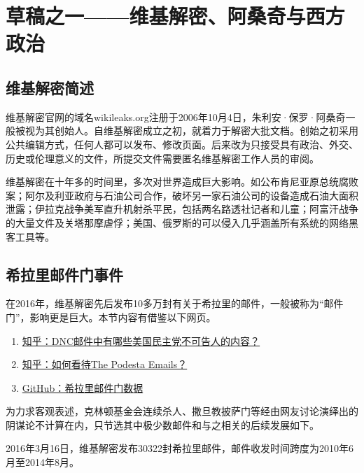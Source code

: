 
\chapter{草稿之一——维基解密、阿桑奇与西方政治}

\section{维基解密简述}

维基解密官网的域名wikileaks.org注册于2006年10月4日，朱利安·保罗·阿桑奇一般被视为其创始人。自维基解密成立之初，就着力于解密大批文档。创始之初采用公共编辑方式，任何人都可以发布、修改页面。后来改为只接受具有政治、外交、历史或伦理意义的文件，所提交文件需要匿名维基解密工作人员的审阅。

维基解密在十年多的时间里，多次对世界造成巨大影响。如公布肯尼亚原总统腐败案；阿尔及利亚政府与石油公司合作，破坏另一家石油公司的设备造成石油大面积泄露；伊拉克战争美军直升机射杀平民，包括两名路透社记者和儿童；阿富汗战争的大量文件及关塔那摩虐俘；美国、俄罗斯的可以侵入几乎涵盖所有系统的网络黑客工具等。

\section{希拉里邮件门事件}

在2016年，维基解密先后发布10多万封有关于希拉里的邮件，一般被称为“邮件门”，影响更是巨大。本节内容有借鉴以下网页。
\begin{enumerate}
\item \href{https://www.zhihu.com/question/41676600}{知乎：DNC邮件中有哪些美国民主党不可告人的内容？}

\item \href{https://www.zhihu.com/question/51362588}{知乎：如何看待The Podesta Emails？}

\item \href{https://github.com/zhouningyi/us_selection_crack}{GitHub：希拉里邮件门数据}
\end{enumerate}


为力求客观表述，克林顿基金会连续杀人、撒旦教披萨门等经由网友讨论演绎出的阴谋论不计算在内，只节选其中极少数邮件和与之相关的后续发展如下。

2016年3月16日，维基解密发布30322封希拉里邮件，邮件收发时间跨度为2010年6月至2014年8月。


